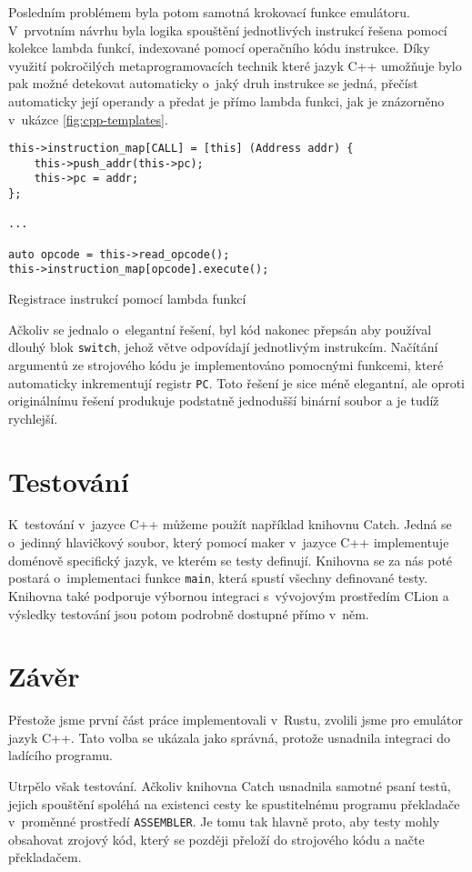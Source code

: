 Posledním problémem byla potom samotná krokovací funkce emulátoru. V~prvotním návrhu byla logika spouštění jednotlivých instrukcí řešena pomocí kolekce lambda funkcí, indexované pomocí operačního kódu instrukce. Díky využití pokročilých metaprogramovacích technik které jazyk C++ umožňuje bylo pak možné detekovat automaticky o~jaký druh instrukce se jedná, přečíst automaticky její operandy a předat je přímo lambda funkci, jak je znázorněno v~ukázce \ref{fig:cpp-templates}.

\begin{listing}
\begin{verbatim}
this->instruction_map[CALL] = [this] (Address addr) {
	this->push_addr(this->pc);
	this->pc = addr;
};

...

auto opcode = this->read_opcode();
this->instruction_map[opcode].execute();
\end{verbatim}
\caption{Registrace instrukcí pomocí lambda funkcí}
\label{fig:cpp-templates}
\end{listing}

Ačkoliv se jednalo o~elegantní řešení, byl kód nakonec přepsán aby používal dlouhý blok \texttt{switch}, jehož větve odpovídají jednotlivým instrukcím. Načítání argumentů ze strojového kódu je implementováno pomocnými funkcemi, které automaticky inkrementují registr \texttt{PC}. Toto řešení je sice méně elegantní, ale oproti originálnímu řešení produkuje podstatně jednodušší binární soubor a je tudíž rychlejší.

\section{Testování}
\label{sec:emu-test}

K~testování v~jazyce C++ můžeme použít například knihovnu Catch\cite{github-catch}. Jedná se o~jedinný hlavičkový soubor, který pomocí maker v~jazyce C++ implementuje doménově specifický jazyk, ve kterém se testy definují. Knihovna se za nás poté postará o~implementaci funkce \texttt{main}, která spustí všechny definované testy. Knihovna také podporuje výbornou integraci s~vývojovým prostředím CLion\cite{clion-catch} a výsledky testování jsou potom podrobně dostupné přímo v~něm.

\section{Závěr}

Přestože jsme první část práce implementovali v~Rustu, zvolili jsme pro emulátor jazyk C++. Tato volba se ukázala jako správná, protože usnadnila integraci do ladícího programu.

Utrpělo však testování. Ačkoliv knihovna Catch usnadnila samotné psaní testů, jejich spouštění spoléhá na existenci cesty ke spustitelnému programu překladače v~proměnné prostředí \texttt{ASSEMBLER}. Je tomu tak hlavně proto, aby testy mohly obsahovat zrojový kód, který se později přeloží do strojového kódu a načte překladačem.